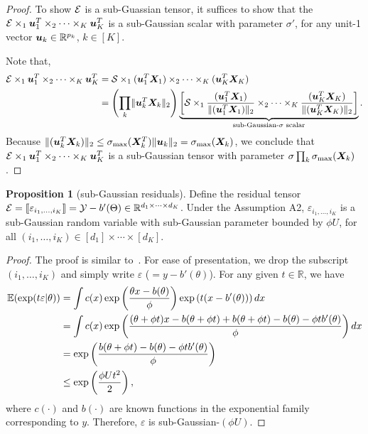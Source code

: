 \documentclass[12pt]{article}
\theoremstyle{definition}
\newtheorem{prop}{Proposition}
\theoremstyle{definition}
\newcommand*{\KeepStyleUnderBrace}[1]{%
  \mathop{%
    \mathchoice
    {\underbrace{\displaystyle#1}}%
    {\underbrace{\textstyle#1}}%
    {\underbrace{\scriptstyle#1}}%
    {\underbrace{\scriptscriptstyle#1}}%
  }\limits
}
\begin{document}
\begin{proof}
To show $\mathcal{E}$ is a sub-Guassian tensor, it suffices to show that the $\mathcal{E}\times_1 \bm{u}^T_1\times_2\cdots\times_K \bm{u}^T_K$ is a sub-Gaussian scalar with parameter $\sigma'$, for any unit-1 vector $\bm{u}_k\in\mathbb{R}^{p_k}$, $k\in[K]$. 

Note that, 
\begin{align}
\tE\times_1 \bmu^T_1\times_2\cdots\times_K \bmu^T_K&=\tS\times_1 (\bmu^T_1\mX_1) \times_2\cdots\times_K (\bmu^T_K\mX_K)\\
&= \left(\prod_k \vnormSize{}{\bmu^T_k\mX_k}\right) \KeepStyleUnderBrace{\left[\tS\times_1 { (\bmu^T_1\mX_1)\over \vnormSize{}{(\bmu^T_1\mX_1)}}\times_2\cdots\times_K { (\bmu^T_K\mX_K)\over \vnormSize{}{(\bmu^T_K\mX_K)}}\right]}_{\text{sub-Gaussian-$\sigma$ scalar}}.
\end{align}
Because $\lVert(\bm{u}^T_k\bm X_k)\rVert_2\leq \sigma_{\max}(\bm X^T_k)\lVert\bm{u}_k\rVert_2=\sigma_{\max}(\bm X_k)$, we conclude that $\mathcal{E}\times_1 \bm{u}^T_1\times_2\cdots\times_K \bm{u}^T_K$ is a sub-Gaussian tensor with parameter $\sigma \prod_k \sigma_{\max}(\bm X_k)$. 
\end{proof}

\begin{prop}[sub-Gaussian residuals]\label{prop}
Define the residual tensor $\mathcal{E}=\llbracket \varepsilon_{i_1,\ldots,i_K} \rrbracket=\mathcal{Y}-b'(\Theta)\in\mathbb{R}^{d_1\times \cdots \times d_K}$. Under the Assumption A2, $\varepsilon_{i_1,\ldots,i_K}$ is a sub-Gaussian random variable with sub-Gaussian parameter bounded by $\phi U$, for all $(i_1,\ldots,i_K)\in[d_1]\times\cdots\times[d_K]$.
\end{prop}
\begin{proof} The proof is similar to~\citet[Lemma 3]{fan2019generalized}. For ease of presentation, we drop the subscript $(i_1,\ldots,i_K)$ and simply write $\varepsilon$ ($=y-b'(\theta)$). For any given $t\in\mathbb{R}$, we have
\begin{align}
\mathbb{E}(\exp(t\varepsilon|\theta))&=\int c(x) \exp\left({\theta x - b(\theta)\over \phi}   \right)\exp \left(t(x-b'(\theta))\right)dx\\
&=\int c(x)\exp \left( {(\theta + \phi t)x - b (\theta+\phi t)+b(\theta+\phi t)-b(\theta)-\phi t b'(\theta) \over \phi}\right)dx\\
&=\exp\left( {b(\theta+\phi t)-b(\theta)-\phi t b'(\theta) \over \phi} \right)\\
&\leq \exp\left(\phi U t^2\over 2 \right),
\end{align}
where $c(\cdot)$ and $b(\cdot)$ are known functions in the exponential family corresponding to $y$. 
Therefore, $\varepsilon$ is sub-Gaussian-$(\phi U)$. \end{proof}
\end{document}
